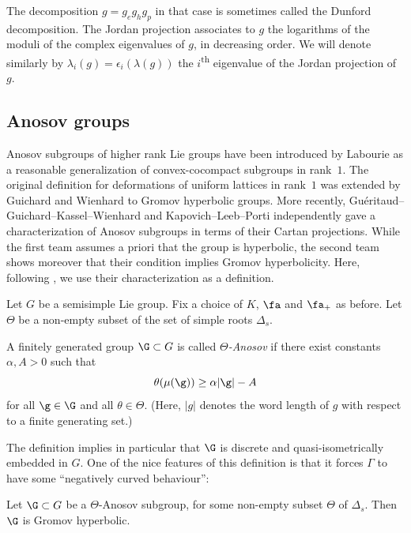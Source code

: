 The decomposition $g = g_e g_h g_p$ in that case is sometimes called the Dunford decomposition. The Jordan projection associates to $g$ the logarithms of the moduli of the complex eigenvalues of $g$, in decreasing order. We will denote similarly by $\lambda_i(g)= \epsilon_i(\lambda(g))$ the $i$\textsuperscript{th} eigenvalue of the Jordan projection of $g$.

\subsection{Anosov groups}\label{subsubsec-Anosov representation}

Anosov subgroups of higher rank Lie groups have been introduced by Labourie \cite{labourie2006anosov} as a reasonable generalization of convex-cocompact subgroups in rank~$1$. The original definition for deformations of uniform lattices in rank~$1$ was extended by Guichard and Wienhard to Gromov hyperbolic groups. More recently, Guéritaud--Guichard--Kassel--Wienhard \cite{gueritaud20017anosov} and Kapovich--Leeb--Porti \cite{kapovich2017anosov} independently gave a characterization of Anosov subgroups in terms of their Cartan projections. While the first team assumes a priori that the group is hyperbolic, the second team shows moreover that their condition implies Gromov hyperbolicity. Here, following \cite{Guichard}, we use their characterization as a definition.

Let $G$ be a semisimple Lie group. Fix a choice of $K$, $\fa$ and $\fa_+$ as before. Let $\Theta$ be a non-empty subset of the set of simple roots $\Delta_s$.

\begin{defi}
A finitely generated group $\G \subset G$ is called \emph{$\Theta$-Anosov} if there exist constants $\alpha, A>0$ such that
\[\theta(\mu(\g)) \geq \alpha \vert \g \vert - A \]
for all $\g\in \G$ and all $\theta \in \Theta$.
(Here, $\vert g \vert$ denotes the word length of $g$ with respect to a finite generating set.)
\end{defi}
The definition implies in particular that $\G$ is discrete and quasi-isometrically embedded in $G$. One of the nice features of this definition is that it forces $\Gamma$ to have some ``negatively curved behaviour'':

\begin{theo}
Let $\G \subset G$ be a $\Theta$-Anosov subgroup, for some non-empty subset $\Theta$ of $\Delta_s$. Then $\G$ is Gromov hyperbolic.
\end{theo}

